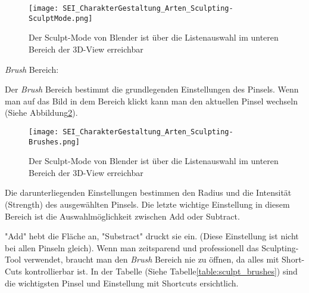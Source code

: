 \begin{figure}[H]
    \centering
    \texttt{[image: SEI\_CharakterGestaltung\_Arten\_Sculpting-SculptMode.png]}
    \caption{Der Sculpt-Mode von Blender ist über die Listenauswahl im unteren Bereich der 3D-View erreichbar}
    \label{picture:sculpt_mode}
\end{figure}

\textit{Brush} Bereich\citep{blender:sculpting_brushes}:

Der \textit{Brush} Bereich bestimmt die grundlegenden Einstellungen des Pinsels.
Wenn man auf das Bild in dem Bereich klickt
kann man den aktuellen Pinsel wechseln (Siehe Abbildung\ref{picture:sculpt_brushes}).
\begin{figure}[H]
    \centering
    \texttt{[image: SEI\_CharakterGestaltung\_Arten\_Sculpting-Brushes.png]}
    \caption{Der Sculpt-Mode von Blender ist über die Listenauswahl im unteren Bereich der 3D-View erreichbar}
    \label{picture:sculpt_brushes}
\end{figure}
Die darunterliegenden Einstellungen bestimmen den Radius
und die Intensität (Strength) des ausgewählten Pinsels. Die
letzte wichtige Einstellung in diesem Bereich ist die
Auswahlmöglichkeit zwischen Add oder Subtract.

"Add" hebt die Fläche an, "Substract" druckt sie ein. (Diese Einstellung ist
nicht bei allen Pinseln gleich). Wenn man zeitsparend und
professionell das Sculpting-Tool verwendet, braucht man den
\textit{Brush} Bereich nie zu öffnen, da alles mit Short-Cuts
kontrollierbar ist. In der Tabelle (Siehe Tabelle\ref{table:sculpt_brushes}) sind die
wichtigsten Pinsel und Einstellung mit Shortcuts ersichtlich.

